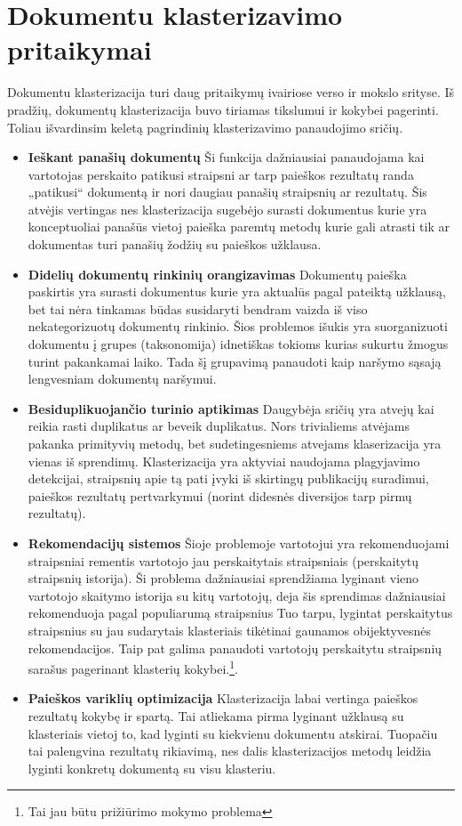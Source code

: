 \documentclass{VUMIFInfKursinis}
\begin{document}
\section{Dokumentu klasterizavimo pritaikymai}
Dokumentu klasterizacija turi daug pritaikymų ivairiose verso ir mokslo srityse. Iš pradžių, dokumentų klasterizacija buvo tiriamas  tikslumui ir kokybei pagerinti. Toliau išvardinsim keletą pagrindinių klasterizavimo panaudojimo sričių\cite{jajoo2008document}.
\begin{itemize}
	\item \textbf{Ieškant panašių dokumentų} Ši funkcija dažniausiai panaudojama kai vartotojas perskaito patikusi straipsni ar tarp paieškos rezultatų randa „patikusi“ dokumentą ir nori daugiau panašių straipsnių ar rezultatų. Šis atvėjis vertingas nes klasterizacija sugebėjo surasti dokumentus kurie yra konceptuoliai panašūs vietoj paieška paremtų metodų kurie gali atrasti tik ar dokumentas turi panašių žodžių su paieškos užklausa.  
	\item \textbf{Didelių dokumentų rinkinių orangizavimas} Dokumentų paieška paskirtis yra surasti dokumentus kurie yra aktualūs pagal pateiktą užklausą, bet tai nėra tinkamas būdas susidaryti bendram vaizda iš viso nekategorizuotų dokumentų rinkinio. Šios problemos išukis yra suorganizuoti dokumentu į grupes (taksonomija) idnetiškas tokioms kurias sukurtu žmogus turint pakankamai laiko. Tada šį grupavimą panaudoti kaip naršymo sąsają lengvesniam dokumentų naršymui. 
	\item \textbf{Besiduplikuojančio turinio aptikimas} Daugybėja sričių yra atvejų kai reikia rasti duplikatus ar beveik duplikatus. Nors trivialiems atvėjams pakanka primityvių metodų, bet sudetingesniems atvejams klaserizacija yra vienas iš sprendimų. Klasterizacija yra aktyviai naudojama plagyjavimo detekcijai, straipsnių apie tą pati įvyki iš skirtingų publikacijų suradimui, paieškos rezultatų pertvarkymui (norint didesnės diversijos tarp pirmų rezultatų).
	\item \textbf{Rekomendacijų sistemos} Šioje problemoje vartotojui yra rekomenduojami straipsniai rementis vartotojo jau perskaitytais straipsniais (perskaitytų straipsnių istorija). Ši problema dažniausiai sprendžiama lyginant vieno vartotojo skaitymo istorija su kitų vartotojų, deja šis sprendimas dažniausiai rekomenduoja pagal populiarumą straipsnius  Tuo tarpu, lygintat perskaitytus straipsnius su jau sudarytais klasteriais tikėtinai gaunamos obijektyvesnės rekomendacijos. Taip pat galima panaudoti vartotojų perskaitytu straipsnių sarašus pagerinant klasterių kokybei.\footnote{Tai jau būtu prižiūrimo mokymo problema}.
	\item \textbf{Paieškos variklių optimizacija} Klasterizacija labai vertinga paieškos rezultatų kokybę ir spartą. Tai atliekama pirma lyginant užklausą su klasteriais vietoj to, kad lyginti su kiekvienu dokumentu atskirai. Tuopačiu tai palengvina rezultatų rikiavimą, nes dalis klasterizacijos metodų leidžia lyginti konkretų dokumentą su visu klasteriu.  
\end{itemize}
\end{document}
